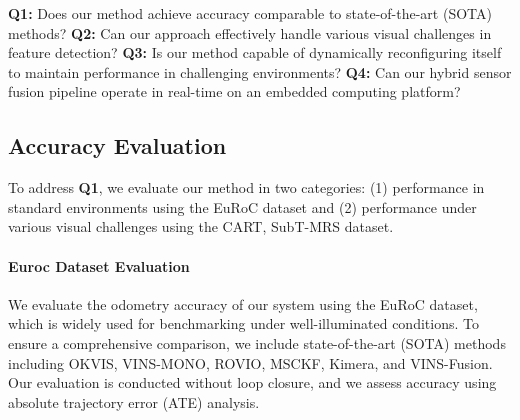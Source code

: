 \textbf{Q1:} Does our method achieve accuracy comparable to state-of-the-art (SOTA) methods?
\textbf{Q2:} Can our approach effectively handle various visual challenges in feature detection?
\textbf{Q3:} Is our method capable of dynamically reconfiguring itself to maintain performance in challenging environments?
\textbf{Q4:} Can our hybrid sensor fusion pipeline operate in real-time on an embedded computing platform?





\subsection{Accuracy Evaluation}
\label{sec:accuracy}

To address \textbf{Q1}, we evaluate our method in two categories: (1) performance in standard environments using the EuRoC dataset\cite{burri2016euroc} and (2) performance under various visual challenges using the CART\cite{lee2024caltech}, SubT-MRS\cite{zhao2023subtmrs} dataset.   

\paragraph{\textbf{Euroc Dataset Evaluation}}
We evaluate the odometry accuracy of our system using the EuRoC dataset\cite{burri2016euroc}, which is widely used for benchmarking under well-illuminated conditions. To ensure a comprehensive comparison, we include state-of-the-art (SOTA) methods including OKVIS\cite{leutenegger2015keyframe}, VINS-MONO\cite{qin2017vins}, ROVIO\cite{flemmen2021rovtio}, MSCKF\cite{mourikis2007multi}, Kimera\cite{rosinol2020kimera}, and VINS-Fusion\cite{qin2018vins}. Our evaluation is conducted without loop closure, and we assess accuracy using absolute trajectory error (ATE) analysis\cite{grupp2017evo}.

